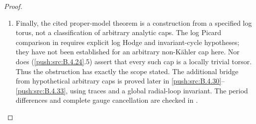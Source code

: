 \begin{proof}
\begin{enumerate}[label=\arabic*.,leftmargin=*]
\item Finally, the cited proper-model theorem is a
construction from a specified log torus, not
a classification of arbitrary analytic caps.
The log Picard comparison in
\citet[Sections 7--9]{KKN2008PicardE} requires
explicit log Hodge and invariant-cycle hypotheses;
they have not been established for an arbitrary
non-K\"ahler cap here. Nor does (\ref{push:src:B.4.24}.5)
assert that every such cap is a locally trivial
torsor. Thus the obstruction has exactly the
scope stated. The additional bridge from hypothetical
arbitrary caps is proved later in \ref{push:src:B.4.30}--\ref{push:src:B.4.33},
using traces and a global radial-loop invariant.
The period differences and complete
gauge cancellation are checked in
.
\end{enumerate}
\end{proof}

